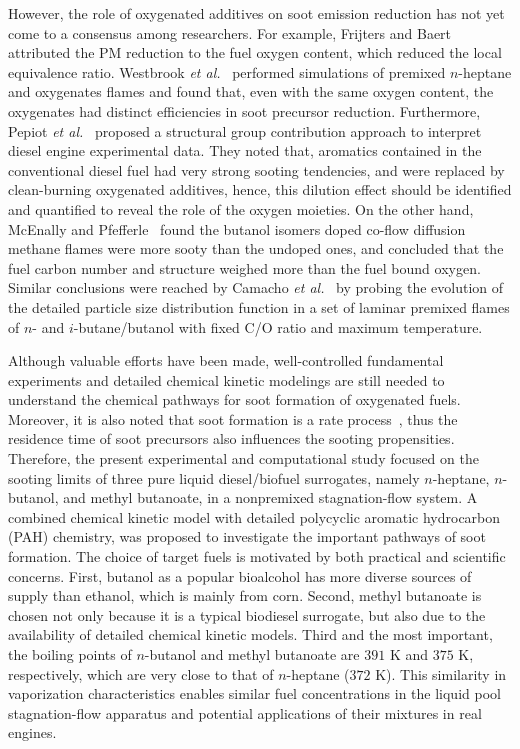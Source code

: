 \documentclass[preprint,3p,times,twocolumn]{elsarticleUS}
\begin{document}
However, the role of oxygenated additives on soot emission reduction has not yet come to a consensus among researchers. For example, Frijters and Baert~\cite{frijters06} attributed the PM reduction to the fuel oxygen content, which reduced the local equivalence ratio. Westbrook \emph{et al.}~\cite{westbrook06} performed simulations of premixed $n$-heptane and oxygenates flames and found that, even with the same oxygen content, the oxygenates had distinct efficiencies in soot precursor reduction. Furthermore, Pepiot \emph{et al.}~\cite{desjardins08} proposed a structural group contribution approach to interpret diesel engine experimental data. They noted that, aromatics contained in the conventional diesel fuel had very strong sooting tendencies, and were replaced by clean-burning oxygenated additives, hence, this dilution effect should be identified and quantified to reveal the role of the oxygen moieties. On the other hand, McEnally and Pfefferle~\cite{mcenally05,mcenally11} found the butanol isomers doped co-flow diffusion methane flames were more sooty than the undoped ones, and concluded that the fuel  carbon number and structure weighed more than the fuel bound oxygen. Similar conclusions were reached by Camacho \emph{et al.}~\cite{camacho13} by probing the evolution of the detailed particle size distribution function in a set of laminar premixed flames of $n$- and $i$-butane/butanol with fixed C/O ratio and maximum temperature. 

Although valuable efforts have been made, well-controlled fundamental experiments and detailed chemical kinetic modelings are still needed to understand the chemical pathways for soot formation of oxygenated fuels. Moreover, it is also noted that soot formation is a rate process~\cite{vandsburger85}, thus the residence time of soot precursors also influences the sooting propensities\cite{tsuji71}. Therefore, the present experimental and computational study focused on the sooting limits of three pure liquid diesel/biofuel surrogates, namely $n$-heptane, $n$-butanol, and methyl butanoate, in a nonpremixed stagnation-flow system. A combined chemical kinetic model with detailed polycyclic aromatic hydrocarbon (PAH) chemistry, was proposed to investigate the important pathways of soot formation. The choice of target fuels is motivated by both practical and scientific concerns. First, butanol as a popular bioalcohol has more diverse sources of supply than ethanol, which is mainly from corn. Second, methyl butanoate is chosen not only because it is a typical biodiesel surrogate, but also due to the availability of detailed chemical kinetic models. Third and the most important, the boiling points of $n$-butanol and methyl butanoate are $391$ K and $375$ K, respectively, which are very close to that of $n$-heptane ($372$ K). This similarity in vaporization characteristics enables similar fuel concentrations in the liquid pool stagnation-flow apparatus and potential applications of their mixtures in real engines.
\end{document}
